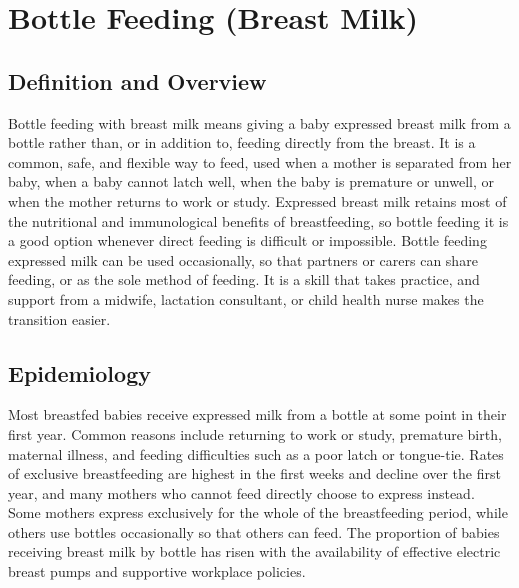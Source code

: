 \chapter{Bottle Feeding (Breast Milk)}

\section*{Definition and Overview}
Bottle feeding with breast milk means giving a baby expressed breast milk from a bottle rather than, or in addition to, feeding directly from the breast. It is a common, safe, and flexible way to feed, used when a mother is separated from her baby, when a baby cannot latch well, when the baby is premature or unwell, or when the mother returns to work or study. Expressed breast milk retains most of the nutritional and immunological benefits of breastfeeding, so bottle feeding it is a good option whenever direct feeding is difficult or impossible. Bottle feeding expressed milk can be used occasionally, so that partners or carers can share feeding, or as the sole method of feeding. It is a skill that takes practice, and support from a midwife, lactation consultant, or child health nurse makes the transition easier.

\section*{Epidemiology}
Most breastfed babies receive expressed milk from a bottle at some point in their first year. Common reasons include returning to work or study, premature birth, maternal illness, and feeding difficulties such as a poor latch or tongue-tie. Rates of exclusive breastfeeding are highest in the first weeks and decline over the first year, and many mothers who cannot feed directly choose to express instead. Some mothers express exclusively for the whole of the breastfeeding period, while others use bottles occasionally so that others can feed. The proportion of babies receiving breast milk by bottle has risen with the availability of effective electric breast pumps and supportive workplace policies.

